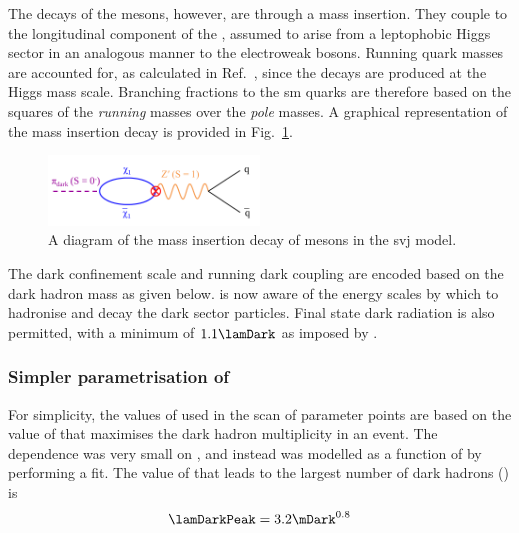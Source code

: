 The decays of the \Ppidark mesons, however, are through a mass insertion. They couple to the longitudinal component of the \PZprime, assumed to arise from a leptophobic Higgs sector in an analogous manner to the electroweak bosons. Running quark masses are accounted for, as calculated in Ref.~, since the decays are produced at the Higgs mass scale. Branching fractions to the \acrshort{sm} quarks are therefore based on the squares of the \emph{running} masses over the \emph{pole} masses. A graphical representation of the mass insertion decay is provided in Fig.~\ref{fig:svj_mass_insertion}.


\begin{figure}[htbp]
    \centering
    \includegraphics[width=0.5\textwidth]{figures/mass_insertion_diagram.pdf}
    \caption[A diagram of the mass insertion decay of \Ppidark mesons in the \schannel semi-visible jet model]{A diagram of the mass insertion decay of \Ppidark mesons in the \schannel \gls{svj} model.}
    \label{fig:svj_mass_insertion}
\end{figure}

The dark confinement scale \lamDark and running dark coupling \aDark are encoded based on the dark hadron mass as given below. \PYTHIA is now aware of the energy scales by which to hadronise and decay the dark sector particles. Final state dark radiation is also permitted, with a minimum \pt of $\text{1.1}\lamDark$ as imposed by \PYTHIA.




\subsubsection{Simpler parametrisation of \texorpdfstring{\aDark}{alpha\_dark}}
\label{subsubsec:svj_effective_alpha_dark}

For simplicity, the values of \aDark used in the scan of parameter points are based on the value of \lamDark that maximises the dark hadron multiplicity in an event. The dependence was very small on \mZprime, and instead was modelled as a function of \mDark by performing a fit. The value of \lamDark that leads to the largest number of dark hadrons (\lamDarkPeak) is
\begin{equation}
    \lamDarkPeak = 3.2 \mDark^{0.8}
    \label{eq:lambda_dark_peak_v_m_dark}
\end{equation}

